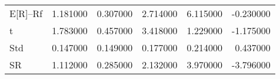 \begin{tabular}{lrrrrr}
\toprule
\midrule
E[R]--Rf & 1.181000 & 0.307000 & 2.714000 & 6.115000 & -0.230000 \\
t & 1.783000 & 0.457000 & 3.418000 & 1.229000 & -1.175000 \\
Std & 0.147000 & 0.149000 & 0.177000 & 0.214000 & 0.437000 \\
SR & 1.112000 & 0.285000 & 2.132000 & 3.970000 & -3.796000 \\
\bottomrule
\end{tabular}
